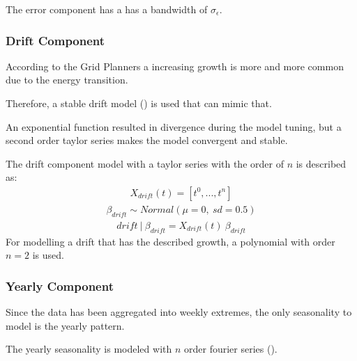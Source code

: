 \documentclass[letterpaper,10pt,english]{sphinxmanual}
\begin{document}
The error component has a has a bandwidth of \(\sigma_\epsilon\).


\subsubsection{Drift Component}
\label{\detokenize{modeling:drift-component}}
According to the Grid Planners a increasing growth is more and more common due to the energy transition.

Therefore, a stable drift model ({\hyperref[\detokenize{autoapi/src/model/model/index:src.model.model.drift_model}]{}}) is used that can mimic that.

An exponential function resulted in divergence during the model tuning, but a second order taylor series makes the model convergent and stable.

The drift component model with a taylor series with the order of \(n\) is described as:
\begin{equation*}
\begin{split}X_{drift}(t) = [t^0, ...,  t^n]\end{split}
\end{equation*}\begin{equation*}
\begin{split}\beta_{drift} \sim Normal(\mu=0, \:sd=0.5)\end{split}
\end{equation*}\begin{equation*}
\begin{split}drift\:|\:\beta_{drift} = X_{drift}(t)\:\beta_{drift}\end{split}
\end{equation*}
For modelling a drift that has the described growth, a polynomial with order \(n=2\) is used.


\subsubsection{Yearly Component}
\label{\detokenize{modeling:yearly-component}}
Since the data has been aggregated into weekly extremes, the only seasonality to model is the yearly pattern.

The yearly seasonality is modeled with \(n\) order fourier series ({\hyperref[\detokenize{autoapi/src/model/model/index:src.model.model.seasonality_model}]{}}).
\end{document}
